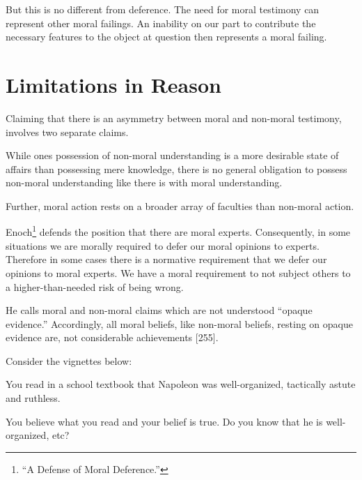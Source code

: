 \documentclass[
  12pt,
]{book}
\newenvironment{Shaded}{\begin{snugshade}}{\end{snugshade}}
\newcommand{\NormalTok}[1]{#1}
\theoremstyle{definition}
\theoremstyle{definition}
\theoremstyle{definition}
\theoremstyle{definition}
\theoremstyle{remark}
\begin{document}
But this is no different from deference. The need for moral testimony can represent other moral failings. An inability on our part to contribute the necessary features to the object at question then represents a moral failing.

\section{Limitations in Reason}\label{limitations-in-reason}

Claiming that there is an asymmetry between moral and non-moral testimony, involves two separate claims.

\begin{Shaded}
\begin{Highlighting}[]

\NormalTok{While one\textquotesingle{}s possession of non{-}moral understanding is a more desirable state of affairs than possessing mere knowledge, there is no general obligation to possess non{-}moral understanding like there is with moral understanding.}
\end{Highlighting}
\end{Shaded}

Further, moral action rests on a broader array of faculties than non-moral action.

Enoch\footnote{{``A {Defense} of {Moral Deference}.''}} defends the position that there are moral experts. Consequently, in some situations we are morally required to defer our moral opinions to experts. Therefore in some cases there is a normative requirement that we defer our opinions to moral experts. We have a moral requirement to not subject others to a higher-than-needed risk of being wrong.

He calls moral and non-moral claims which are not understood ``opaque evidence.'' Accordingly, all moral beliefs, like non-moral beliefs, resting on opaque evidence are, not considerable achievements {[}255{]}.

Consider the vignettes below:

\begin{Shaded}
\begin{Highlighting}[]

\NormalTok{You read in a school textbook that Napoleon was well{-}organized, tactically astute and ruthless.}
\end{Highlighting}
\end{Shaded}

You believe what you read and your belief is true. Do you know that he is well-organized, etc?
\end{document}
